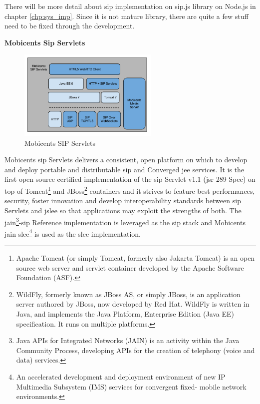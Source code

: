 \par There will be more detail about \gls{sip} implementation on sip.js library on Node.js in chapter \ref{chp:sys_imp}. Since it is not mature library, there are quite a few stuff need to be fixed through the development.

\textbf{Mobicents Sip Servlets}

\begin{figure}
	\centering
    	\includegraphics[width=0.60\textwidth,natwidth=610,natheight=642]{figs/mobicents.png}
  	\caption{Mobicents SIP Servlets\cite{code:mobicents}}
  	\label{fig:mobicents}
\end{figure}

\par Mobicents \gls{sip} Servlets delivers a consistent, open platform on which to develop and deploy portable and distributable \gls{sip} and Converged \gls{jee} services.  It is the first open source certified implementation of the \gls{sip} Servlet v1.1 (\gls{jsr} 289 Spec) on top of Tomcat\footnote{Apache Tomcat (or simply Tomcat, formerly also Jakarta Tomcat) is an open source web server and servlet container developed by the Apache Software Foundation (ASF).\cite{wiki:tomcat}} and JBoss\footnote{WildFly, formerly known as JBoss AS, or simply JBoss, is an application server authored by JBoss, now developed by Red Hat. WildFly is written in Java, and implements the Java Platform, Enterprise Edition (Java EE) specification. It runs on multiple platforms.\cite{wiki:jboss}} containers and it strives to feature best performances, security, foster innovation and develop interoperability standards between \gls{sip} Servlets and \gls{jslee} so that applications may exploit the strengths of both. The \gls{jain}\footnote{Java APIs for Integrated Networks (JAIN) is an activity within the Java Community Process, developing APIs for the creation of telephony (voice and data) services.\cite{wiki:jain}}-\gls{sip} Reference implementation is leveraged as the \gls{sip} stack and Mobicents \gls{jain} \gls{slee}\footnote{An accelerated development and deployment environment of new IP Multimedia Subsystem (IMS) services for convergent fixed- mobile network environments.\cite{website:slee}} is used as the \gls{slee} implementation.

